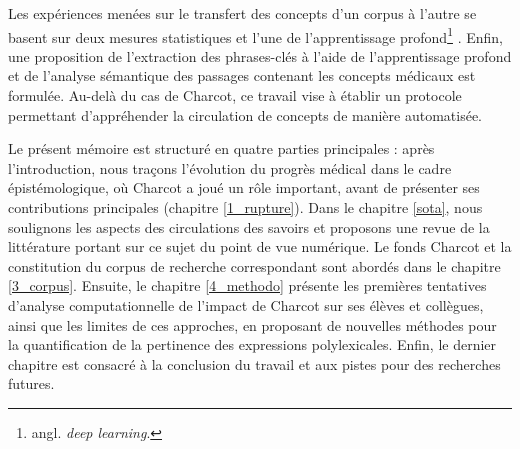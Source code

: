 Les expériences menées sur le transfert des concepts d'un corpus à l'autre se basent sur deux mesures statistiques et l'une de l'apprentissage profond\footnote{angl. \textit{deep learning}.} . Enfin, une proposition de l'extraction des phrases-clés à l'aide de l'apprentissage profond et de l'analyse sémantique des passages contenant les concepts médicaux est formulée. Au-delà du cas de Charcot, ce travail vise à établir un protocole permettant d'appréhender la circulation de concepts de manière
automatisée.

Le présent mémoire est structuré en quatre parties principales : après l'introduction, nous traçons l'évolution du progrès médical dans le cadre épistémologique, où Charcot a joué un rôle important, avant de présenter ses contributions principales (chapitre \ref{1_rupture}). Dans le chapitre \ref{sota}, nous soulignons les aspects des circulations des savoirs et proposons une revue de la littérature portant sur ce sujet du point de vue numérique. Le fonds Charcot et la constitution du corpus de recherche correspondant sont abordés dans le chapitre \ref{3_corpus}. Ensuite, le chapitre \ref{4_methodo} présente les premières tentatives d'analyse computationnelle de l'impact de Charcot sur ses élèves et collègues, ainsi que les limites de ces approches, en proposant de nouvelles méthodes pour la quantification de la pertinence des expressions polylexicales. Enfin, le dernier chapitre est consacré à la conclusion du travail et aux pistes pour des recherches futures.










